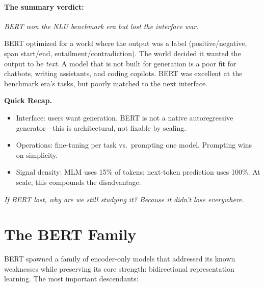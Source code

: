 \paragraph{The summary verdict:}

\begin{center}
\textit{BERT won the NLU benchmark era but lost the interface war.}
\end{center}

BERT optimized for a world where the output was a label (positive/negative, span start/end, entailment/contradiction). The world decided it wanted the output to be \emph{text}. A model that is not built for generation is a poor fit for chatbots, writing assistants, and coding copilots. BERT was excellent at the benchmark era's tasks, but poorly matched to the next interface.

\begin{quickrecap}
\textbf{Quick Recap.}
\begin{itemize}[nosep,leftmargin=1.5em]
  \item Interface: users want generation. BERT is not a native autoregressive generator---this is architectural, not fixable by scaling.
  \item Operations: fine-tuning per task vs.\ prompting one model. Prompting wins on simplicity.
  \item Signal density: MLM uses 15\% of tokens; next-token prediction uses 100\%. At scale, this compounds the disadvantage.
\end{itemize}
\textit{If BERT lost, why are we still studying it? Because it didn't lose everywhere.}
\end{quickrecap}

\noindent{}


\section{The BERT Family}
\label{sec:bert-family}

BERT spawned a family of encoder-only models that addressed its known weaknesses while preserving its core strength: bidirectional representation learning. The most important descendants:

